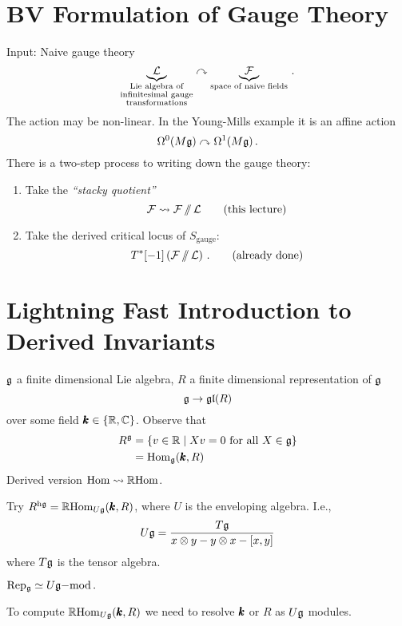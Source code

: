 \section{BV Formulation of Gauge Theory}

Input: Naive gauge theory
\begin{equation*}
\underbrace{\mathcal{L}}_{
  \substack{\text{Lie algebra of}\\
    \text{infinitesimal gauge}\\
    \text{transformations}} } \curvearrowright
\underbrace{\mathcal{F}}_{\text{space of naive fields}}\,.
\end{equation*}
The action may be non-linear. In the Young-Mills example it is an
affine action
\begin{equation*}
  \Omega^0 (M\mathfrak{g})\curvearrowright\Omega^1 (M\mathfrak{g})\,.
\end{equation*}
There is a two-step process to writing down the gauge theory:
\begin{enumerate}
\item Take the {\em ``stacky quotient''}
  \begin{equation*}
    \mathcal{F} \rightsquigarrow \mathcal{F} \operatorname{/\mkern-6mu/} \mathcal{L} \qquad \text{(this lecture)}
  \end{equation*}
\item Take the derived critical locus of $S_\text{gauge}$:
  \begin{equation*}
    T^*[-1]\left(\mathcal{F}\operatorname{/\mkern-6mu/}\mathcal{L}\right)\,. \qquad \text{(already done)}
  \end{equation*}
\end{enumerate}

\section{Lightning Fast Introduction to Derived Invariants}
$\mathfrak{g}$ a finite dimensional Lie algebra, $R$ a finite dimensional
representation of $\mathfrak{g}$
\begin{equation*}
  \mathfrak{g}\rightarrow\mathfrak{gl} (R)
\end{equation*}
over some field $\pmb{k}\in\{\mathbb{R},\mathbb{C}\}$.
Observe that
\begin{align*}
  R^{\mathfrak{g}}&=\{v\in \mathbb{R} \mid Xv=0 \text{ for all } X\in\mathfrak{g} \}\\
          &=\mathrm{Hom}_{\mathfrak{g}} (\pmb{k},R)
\end{align*}
Derived version $\mathrm{Hom} \rightsquigarrow \mathbb{R}\mathrm{Hom}$.

Try $R^{\mathrm{h}\mathfrak{g}}=\mathbb{R}\mathrm{Hom}_{U\mathfrak{g}} (\pmb{k},R)$, where
$U$ is the enveloping algebra. I.e.,
\begin{equation*}
  U\mathfrak{g}=\frac{T\mathfrak{g}}{x\otimes{}y-y\otimes{}x-[x,y]}
\end{equation*}
where $T\mathfrak{g}$ is the tensor algebra.
\begin{fact}
  $\mathrm{Rep_{\mathfrak{g}}}\simeq U\mathfrak{g}\mathrm{-mod}\,.$
\end{fact}
To compute $\mathbb{R}\mathrm{Hom}_{U\mathfrak{g}} (\pmb{k},R)$ we need to resolve $\pmb{k}$
or $R$ as $U\mathfrak{g}$ modules.

